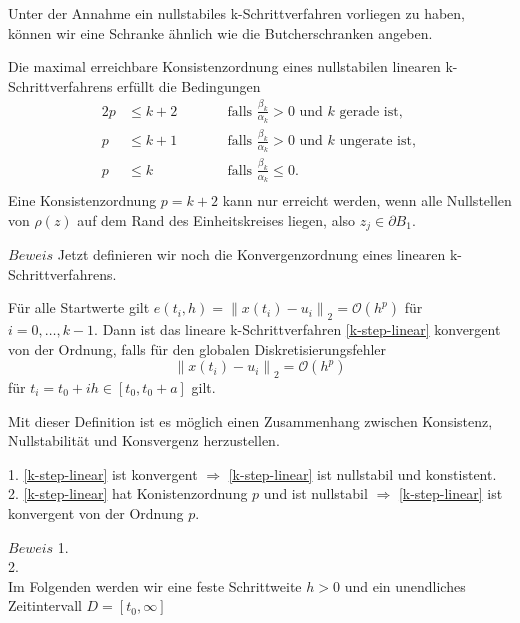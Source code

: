 Unter der Annahme ein nullstabiles k-Schrittverfahren vorliegen zu haben, können wir eine Schranke ähnlich wie die
Butcherschranken angeben.
\begin{satz}
    \label{erste-dahl}
    Die maximal erreichbare Konsistenzordnung eines nullstabilen linearen k-Schrittverfahrens erfüllt die Bedingungen
    \begin{alignat*}{2}
        p &\leq k+2 \qquad &&\text{falls } \frac{\beta_k}{\alpha_k} > 0 \text{ und } k \text{ gerade ist}, \\
        p &\leq k+1 \qquad &&\text{falls } \frac{\beta_k}{\alpha_k} > 0 \text{ und } k \text{ ungerate ist}, \\
        p &\leq k \qquad &&\text{falls } \frac{\beta_k}{\alpha_k} \leq 0. \\
    \end{alignat*}
    Eine Konsistenzordnung $p=k+2$ kann nur erreicht werden, wenn alle Nullstellen von $\rho(z)$ auf dem Rand des
    Einheitskreises liegen, also $z_j \in \partial B_1$.
\end{satz}
$Beweis$ \cite[386]{ernsthairergerhardwannerSolvingOrdinaryDifferential}
Jetzt definieren wir noch die Konvergenzordnung eines linearen k-Schrittverfahrens.
\begin{definition}
    Für alle Startwerte gilt $e(t_i,h) = \left\lVert x(t_i)-u_i \right\rVert_2 = \mathcal{O}(h^p)$ für $i=0,\dots,k-1$.
    Dann ist das lineare k-Schrittverfahren \eqref{k-step-linear} konvergent von der Ordnung, falls für den globalen
    Diskretisierungsfehler
    \[
        \left\lVert x(t_i)-u_i \right\rVert_2 = \mathcal{O}(h^p)
    \]
    für $t_i = t_0 + ih \in [t_0,t_0+a]$ gilt.
\end{definition}
Mit dieser Definition ist es möglich einen Zusammenhang zwischen Konsistenz, Nullstabilität und Konsvergenz herzustellen.
\begin{satz}
    1. \eqref{k-step-linear} ist konvergent $\Rightarrow$
    \eqref{k-step-linear} ist nullstabil und konstistent.\\
    2. \eqref{k-step-linear} hat Konistenzordnung $p$ und ist nullstabil
        $\Rightarrow$ \eqref{k-step-linear} ist konvergent von der Ordnung $p$.
\end{satz}
$Beweis$ 1. \cite[392]{ernsthairergerhardwannerSolvingOrdinaryDifferential}\\
2. \cite[395,396]{ernsthairergerhardwannerSolvingOrdinaryDifferential}\\
Im Folgenden werden wir eine feste Schrittweite $h > 0$ und ein unendliches Zeitintervall $D=[t_0, \infty]$
